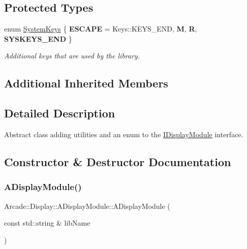 \subsection*{Protected Types}
\begin{DoxyCompactItemize}
\item 
\mbox{\label{classArcade_1_1Display_1_1ADisplayModule_ac438501e449afdad548b42ee2897eabc}} 
enum \mbox{\hyperlink{classArcade_1_1Display_1_1ADisplayModule_ac438501e449afdad548b42ee2897eabc}{System\+Keys}} \{ {\bfseries E\+S\+C\+A\+PE} = Keys\+::K\+E\+Y\+S\+\_\+\+E\+ND, 
{\bfseries M}, 
{\bfseries R}, 
{\bfseries S\+Y\+S\+K\+E\+Y\+S\+\_\+\+E\+ND}
 \}
\begin{DoxyCompactList}\small\item\em Additional keys that are used by the library. \end{DoxyCompactList}\end{DoxyCompactItemize}
\subsection*{Additional Inherited Members}


\subsection{Detailed Description}
Abstract class adding utilities and an enum to the \mbox{\hyperlink{classArcade_1_1Display_1_1IDisplayModule}{I\+Display\+Module}} interface. 

\subsection{Constructor \& Destructor Documentation}
\mbox{\label{classArcade_1_1Display_1_1ADisplayModule_a0aee6322d97b3a421e301c8f0830733e}} 
\subsubsection{\texorpdfstring{ADisplayModule()}{ADisplayModule()}}
{\footnotesize\ttfamily Arcade\+::\+Display\+::\+A\+Display\+Module\+::\+A\+Display\+Module (\begin{DoxyParamCaption}\item[{const std\+::string \&}]{lib\+Name }\end{DoxyParamCaption})}



